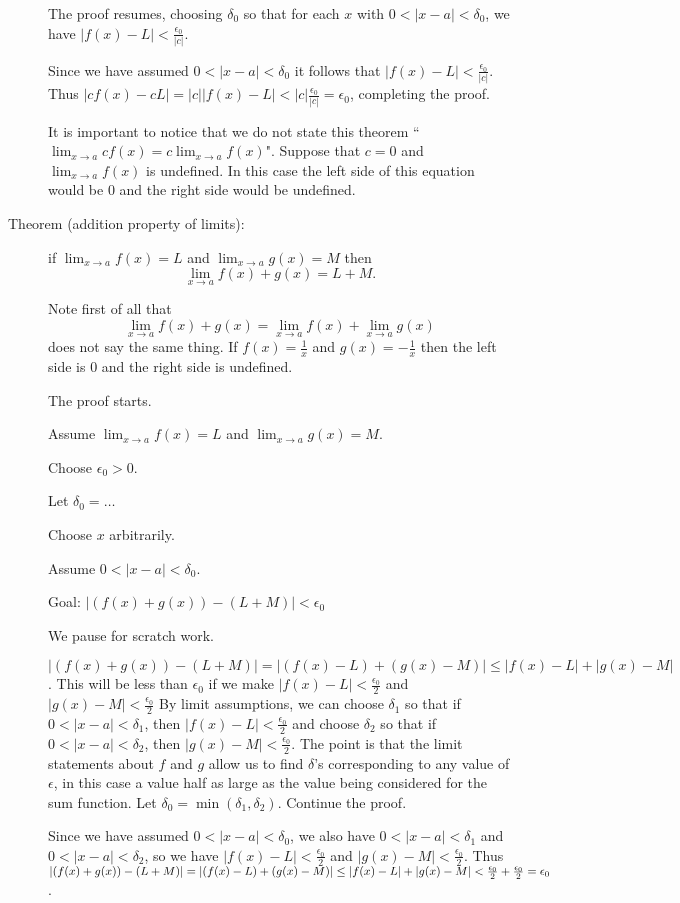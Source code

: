 \documentclass[12pt]{article}
\begin{document}
\begin{description}
The proof resumes, choosing $\delta_0$ so that for each $x$ with $0<|x-a|<\delta_0$, we have $|f(x)-L|<\frac{\epsilon_0}{|c|}$.

Since we have assumed $0<|x-a|<\delta_0$ it follows that $|f(x)-L|<\frac{\epsilon_0}{|c|}$.  Thus
$|cf(x)-cL| = |c||f(x)-L| < |c|\frac{\epsilon_0}{|c|}=\epsilon_0$, completing the proof.

It is important to notice that we do not state this theorem ``$\lim_{x\rightarrow a}cf(x)=c\lim_{x\rightarrow a} f(x)$".
Suppose that $c=0$ and $\lim_{x\rightarrow a}f(x)$ is undefined.  In this case the left side of this equation would be 0
and the right side would be undefined.

\item[Theorem (addition property of limits):]  if $\lim_{x \rightarrow a} f(x)=L$ and $\lim_{x \rightarrow a}g(x)=M$ then
$$\lim_{x \rightarrow a} f(x)+g(x) = L+M.$$

Note first of all that $$\lim_{x \rightarrow a} f(x)+g(x) = \lim_{x \rightarrow a}f(x)+\lim_{x \rightarrow a}g(x)$$ does not say the same thing.  If $f(x)=\frac 1x$ and $g(x)=-\frac 1x$ then the left side is 0 and the right side is undefined.

The proof starts.  

Assume $\lim_{x \rightarrow a} f(x)=L$ and $\lim_{x \rightarrow a}g(x)=M$.

Choose $\epsilon_0>0$.

Let $\delta_0=\ldots$

Choose $x$ arbitrarily.

Assume $0<|x-a|<\delta_0$.

Goal:  $|(f(x)+g(x))-(L+M)|<\epsilon_0$

We pause for scratch work.

$|(f(x)+g(x))-(L+M)| = |(f(x)-L) + (g(x)-M)| \leq |f(x)-L| + |g(x)-M|$.  This will be less than $\epsilon_0$
if we make  $|f(x)-L|<\frac{\epsilon_0}2$ and $|g(x)-M|<\frac{\epsilon_0}2$  By limit assumptions, we can
choose $\delta_1$ so that if $0<|x-a|<\delta_1$, then $|f(x)-L|<\frac{\epsilon_0}2$  and choose $\delta_2$ so that if $0<|x-a|<\delta_2$, then $|g(x)-M|<\frac{\epsilon_0}2$.  The point is that the limit statements about $f$ and $g$
allow us to find $\delta$'s corresponding to any value of $\epsilon$, in this case a value half as large as the value being considered for the sum function.  Let $\delta_0 = \min(\delta_1,\delta_2)$.  Continue the proof.

Since we have assumed $0<|x-a|<\delta_0$, we also have $0<|x-a|<\delta_1$ and $0<|x-a|<\delta_2$, so
we have $|f(x)-L|<\frac{\epsilon_0}2$ and $|g(x)-M|<\frac{\epsilon_0}2$.  Thus $|(f(x)+g(x))-(L+M)| = |(f(x)-L)+(g(x)-M)| \newline \leq |f(x)-L| + |g(x)-M| < \frac{\epsilon_0}2 +\frac{\epsilon_0}2 = \epsilon_0$.


\end{description}
\end{document}
